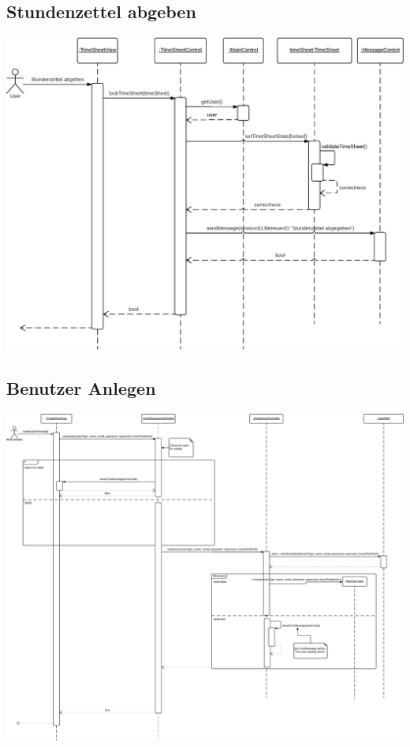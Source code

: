     \subsection{Stundenzettel abgeben}
        \includegraphics[width=\linewidth]{"Diagramms/sequenzes/send_in_timesheet.pdf"}\\
    \subsection{Benutzer Anlegen}
        \includegraphics[width=\linewidth]{"Diagramms/sequenzes/create_user.pdf"}\\
